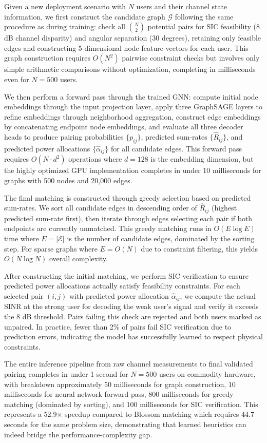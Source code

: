 Given a new deployment scenario with $N$ users and their channel state information, we first construct the candidate graph $\mathcal{G}$ following the same procedure as during training: check all $\binom{N}{2}$ potential pairs for SIC feasibility (8 dB channel disparity) and angular separation (30 degrees), retaining only feasible edges and constructing 5-dimensional node feature vectors for each user. This graph construction requires $O(N^2)$ pairwise constraint checks but involves only simple arithmetic comparisons without optimization, completing in milliseconds even for $N=500$ users.

We then perform a forward pass through the trained GNN: compute initial node embeddings through the input projection layer, apply three GraphSAGE layers to refine embeddings through neighborhood aggregation, construct edge embeddings by concatenating endpoint node embeddings, and evaluate all three decoder heads to produce pairing probabilities $\{p_{ij}\}$, predicted sum-rates $\{\hat{R}_{ij}\}$, and predicted power allocations $\{\hat{\alpha}_{ij}\}$ for all candidate edges. This forward pass requires $O(N \cdot d^2)$ operations where $d=128$ is the embedding dimension, but the highly optimized GPU implementation completes in under 10 milliseconds for graphs with 500 nodes and 20,000 edges.

The final matching is constructed through greedy selection based on predicted sum-rates. We sort all candidate edges in descending order of $\hat{R}_{ij}$ (highest predicted sum-rate first), then iterate through edges selecting each pair if both endpoints are currently unmatched. This greedy matching runs in $O(E \log E)$ time where $E = |\mathcal{E}|$ is the number of candidate edges, dominated by the sorting step. For sparse graphs where $E = O(N)$ due to constraint filtering, this yields $O(N \log N)$ overall complexity.

After constructing the initial matching, we perform SIC verification to ensure predicted power allocations actually satisfy feasibility constraints. For each selected pair $(i,j)$ with predicted power allocation $\hat{\alpha}_{ij}$, we compute the actual SINR at the strong user for decoding the weak user's signal and verify it exceeds the 8 dB threshold. Pairs failing this check are rejected and both users marked as unpaired. In practice, fewer than 2\% of pairs fail SIC verification due to prediction errors, indicating the model has successfully learned to respect physical constraints.

The entire inference pipeline from raw channel measurements to final validated pairing completes in under 1 second for $N=500$ users on commodity hardware, with breakdown approximately 50 milliseconds for graph construction, 10 milliseconds for neural network forward pass, 800 milliseconds for greedy matching (dominated by sorting), and 100 milliseconds for SIC verification. This represents a 52.9× speedup compared to Blossom matching which requires 44.7 seconds for the same problem size, demonstrating that learned heuristics can indeed bridge the performance-complexity gap.


